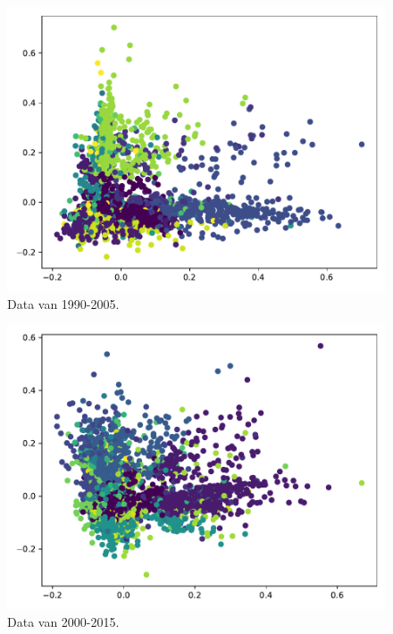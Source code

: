 \documentclass[a4paper,fontsize=11pt]{article}
\begin{document}
\begin{figure}[H]
  \centering
  \includegraphics[width=\textwidth]{pca_1990-2005.pdf}
  \caption{Data van 1990-2005.}
  \label{fig:1990}
\end{figure}

\begin{figure}[H]
  \centering
  \includegraphics[width=\textwidth]{pca_2000-2015.pdf}
  \caption{Data van 2000-2015.}
  \label{fig:2000}
\end{figure}
\end{document}
